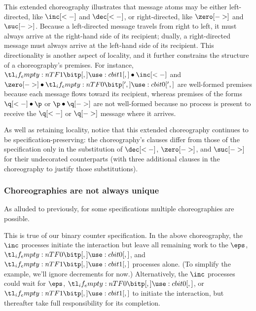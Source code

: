 \documentclass[
  class=../hdeyoung-proposal,
  crop=false
]{standalone}
\begin{document}
This extended choreography illustrates that message atoms may be either left-directed, like $\inc[<-]$ and $\dec[<-]$, or right-directed, like $\zero[->]$ and $\suc[->]$.
% 
Because a left-directed message travels from right to left, it must always arrive at the right-hand side of its recipient; dually, a right-directed message must always arrive at the left-hand side of its recipient.
This directionality is another aspect of locality, and it further constrains the structure of a choreography's premises.  For instance, $\bit{1} \fuse \inc[<-]$ and $\zero[->] \fuse \bit[']{0}$ are well-formed premises because each message flows toward its recipient, whereas premises of the forms $\q[<-] \fuse \p$ or $\p \fuse \q[->]$ are not well-formed because no process is present to receive the $\q[<-]$ or $\q[->]$ message where it arrives.

As well as retaining locality, notice that this extended choreography continues to be specification-preserving:
the choreography's clauses differ from those of the specification only in the substitution of $\dec[<-]$, $\zero[->]$, and $\suc[->]$ for their undecorated counterparts (with three additional clauses in the choreography to justify those substitutions).


\subsubsection{Choreographies are not always unique}\label{sec:mult-chor-are}

As alluded to previously, for some specifications multiple choreographies are possible.

This is true of our binary counter specification.
%
In the above choreography,
the $\inc$ processes initiate the interaction but leave all remaining work to the $\eps$, $\bit{0}$, and $\bit{1}$ processes alone.
(To simplify the example, we'll ignore decrements for now.)
Alternatively, the $\inc$ processes could wait for $\eps$, $\bit{0}$, or $\bit{1}$ to initiate the interaction, but thereafter take full responsibility for its completion.
\end{document}
